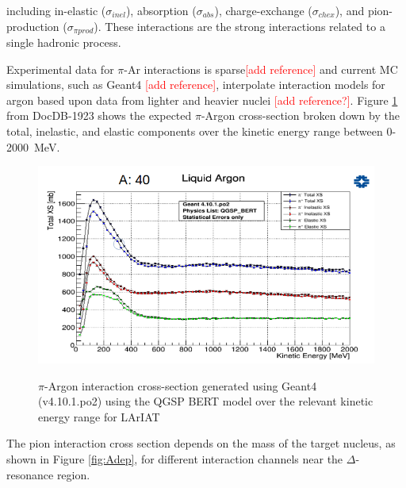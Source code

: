 including in-elastic ($\sigma_{inel}$), absorption ($\sigma_{abs}$), charge-exchange ($\sigma_{chex}$), and pion-production ($\sigma_{\pi prod}$). These interactions are the strong interactions related to a single hadronic process.

Experimental data for $\pi$-Ar interactions is sparse\textcolor{red}{[add reference]} and current MC simulations, such as Geant4 \textcolor{red}{[add reference]}, interpolate interaction models for argon based upon data from lighter and heavier nuclei \textcolor{red}{[add reference?]}.  Figure \ref{fig:Geant4CrossSection} from DocDB-1923 shows the expected $\pi$-Argon cross-section broken down by the total, inelastic, and elastic components over the kinetic energy range between 0-2000~MeV.

\begin{figure}[ht!]
\centering
\includegraphics[scale=0.45]{./images/ArgonPionCrossSection.png}\\
\caption{$\pi$-Argon interaction cross-section generated using Geant4 (v4.10.1.po2) using the QGSP BERT model over the relevant kinetic energy range for LArIAT}
\label{fig:Geant4CrossSection}
\end{figure}

The pion interaction cross section depends on the mass of the target nucleus, as shown in Figure \ref{fig:Adep}, for different interaction channels near the $\Delta$-resonance region.

